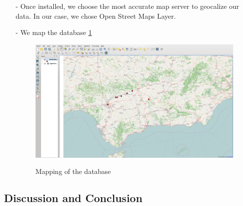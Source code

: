 \documentclass[10pt,a4paper]{article}
\begin{document}
\begin{itemize}
\item[-] Once installed, we choose the most accurate map server to geocalize our data. In our case, we chose Open Street Maps Layer. 
\item[-] We map the database \ref{gismap}

\begin{figure}[hdp]
\centering
\includegraphics[scale=0.50]{gismap.png}
\label{gismap}
\caption{Mapping of the database}
\end{figure}

\end{itemize}

\subsection{Discussion and Conclusion}







































 
\end{document}
